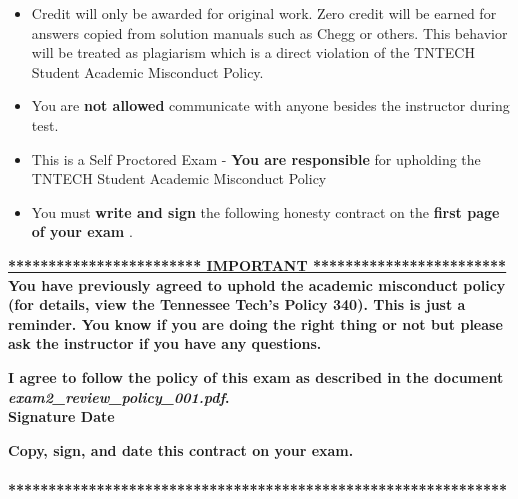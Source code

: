 \documentclass[11pt]{article}
\newcommand{\EXAMNUM}{2\hspace{0mm}}
\newcommand{\SECNUM}{001\hspace{0mm}}
\begin{document}
\begin{itemize}
\begin{itemize}
		\item {\B Credit will only be awarded for original work. Zero credit will be earned for answers copied from solution manuals such as Chegg or others. This behavior will be treated as plagiarism which is a direct violation of the TNTECH Student Academic Misconduct Policy.}

		\item  You are {\bf not allowed} communicate with anyone besides the instructor during test. 
		\item This is a Self Proctored Exam - {\bf You are responsible} for upholding the TNTECH Student Academic Misconduct Policy
		\item  You must {\bf write and sign} the following honesty contract on the {\bf first page of your exam }. 
		
		

\end{itemize}


 {\R  \bf \underline{************************ IMPORTANT ************************}} \vspace{3mm}\\
			  {\R \bf You have previously agreed to uphold the academic misconduct policy (for details, view the
Tennessee Tech's Policy 340). This is just a reminder. You know if you are doing the right thing or not but please ask the instructor if you have any questions. }
\begin{framed}
	
	\vspace{3mm}	 \textbf{ I \underline{\hspace{50mm}} agree to follow the policy of this exam \vspc as described in the document {\it exam\EXAMNUM\_review\_policy\_\SECNUM.pdf}.  }\vspace{3mm}\\
		 \textbf{\Large Signature \underline{\hspace{80mm}} Date\underline{\hspace{20mm} }}\\

\end{framed}
			{\R  \bf Copy, sign, and date this contract on your exam. }   \vspace{1mm}\\
			{\R  \bf \underline{\hspace{140mm}}} \\
			{\R  \bf ***************************************************************} 

\newpage


\end{itemize}
\end{document}
